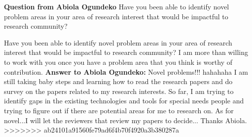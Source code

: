 \textbf{Question from Abiola Ogundeko}
Have you been able to identify novel problem areas in your area of research interest that would be impactful to research community? 

Have you been able to identify novel problem areas in your area of research interest that would be impactful to research community? I am more than willing to work with you once you have a problem area that you think is worthy of contribution.
\textbf{Answer to Abiola Ogundeko:} 
Novel problems!!! hahahaha I am still taking baby steps and learning how to read the research papers and do survey on the papers related to my research interests. So far, I am trying to identify gaps in the existing technologies and tools for special needs people and trying to figure out if there are potential areas for me to research on. As for novel...I will let the reviewers that review my papers to decide... Thanks Abiola.
>>>>>>> ab24101a91560fe79ad6f4b70f4920a3b380287a
